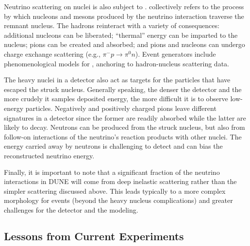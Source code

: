 Neutrino scattering on nuclei is also subject to .  collectively refers to the process by which nucleons and mesons produced by the neutrino interaction traverse the remnant nucleus. The hadrons reinteract with a variety of consequences: additional nucleons can be liberated; ``thermal'' energy can be imparted to the nucleus; pions can be created and absorbed; and pions and nucleons can undergo charge exchange scattering (e.g., $\pi^- p \to \pi^0 n$).  Event generators include phenomenological models for , anchoring to hadron-nucleus scattering data.



The heavy nuclei in a detector also act as targets for the particles that have escaped the struck nucleus. Generally speaking, the denser the detector and the more crudely it samples deposited energy, the more difficult it is to observe low-energy particles. Negatively and positively charged pions leave different signatures in a detector since the former are readily absorbed while the latter are likely to decay.  Neutrons can be produced from the struck nucleus, but also from follow-on interactions of the neutrino's reaction products with other nuclei. The energy carried away by neutrons is challenging to detect and can bias the reconstructed neutrino energy. 

Finally, it is important to note that a significant fraction of the neutrino interactions in DUNE will come from deep inelastic scattering rather than the 
simpler  scattering discussed above.  This leads typically to a more complex morphology for events (beyond the heavy nucleus complications) and greater challenges for the detector and the modeling.  


\subsection{Lessons from Current Experiments}
\label{sec:appx-nd:overview-lessons}

